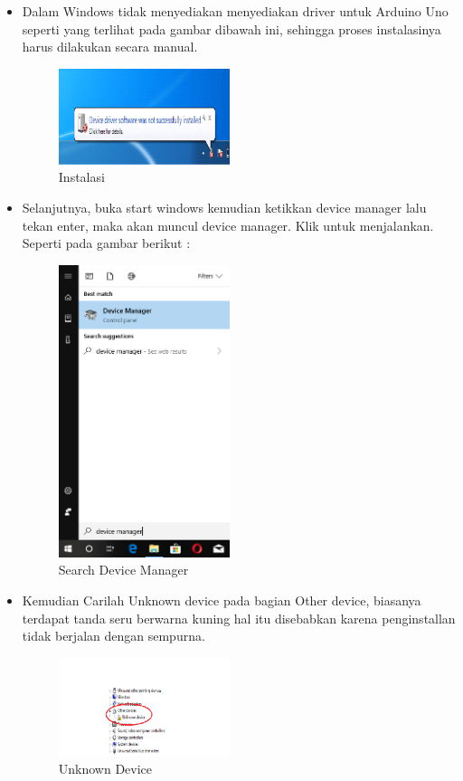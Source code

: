 \begin{enumerate}
\begin{itemize}
\item Dalam Windows tidak menyediakan menyediakan driver untuk Arduino Uno seperti yang terlihat pada gambar dibawah ini, sehingga proses instalasinya harus dilakukan secara manual.
\begin{figure}[ht!]
\includegraphics[width=5cm]{figures/5/1174054/2.png}
\centering
\caption{Instalasi}
\end{figure}

\item Selanjutnya, buka start windows kemudian ketikkan device manager lalu tekan enter, maka akan muncul device manager. Klik untuk menjalankan. Seperti pada gambar berikut :
\begin{figure}[ht!]
\includegraphics[width=5cm]{figures/5/1174054/3.png}
\centering
\caption{Search Device Manager}
\end{figure}

\item Kemudian Carilah Unknown device pada bagian Other device, biasanya terdapat tanda seru berwarna kuning hal itu disebabkan karena penginstallan tidak berjalan dengan sempurna.
\begin{figure}[ht!]
\includegraphics[width=5cm]{figures/5/1174054/4.png}
\centering
\caption{Unknown Device}
\end{figure}


\end{itemize}
\end{enumerate}

